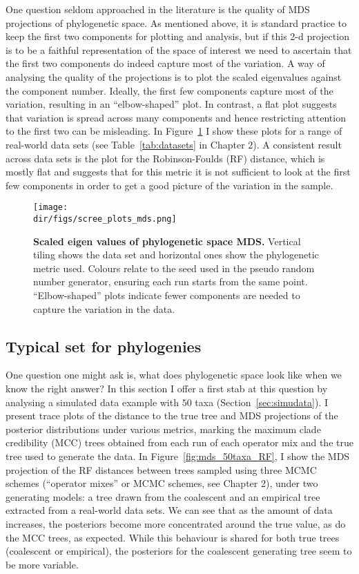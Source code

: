 One question seldom approached in the literature is the quality of MDS projections of phylogenetic space.
As mentioned above, it is standard practice to keep the first two components for plotting and analysis, but if this 2-d  projection is to be a faithful representation of the space of interest we need to ascertain that the first two components do indeed capture most of the variation.
A way of analysing the quality of the projections is to plot the scaled eigenvalues against the component number.
Ideally, the first few components capture most of the variation, resulting in an ``elbow-shaped'' plot.
In contrast, a flat plot suggests that variation is spread across many components and hence restricting attention to the first two can be misleading.
In Figure~\ref{fig:screeplots} I show these plots for a range of real-world data sets (see Table~\ref{tab:datasets} in Chapter 2).
A consistent result across data sets is the plot for the Robinson-Foulds (RF) distance, which is mostly flat and suggests that for this metric it is not sufficient to look at the first few components in order to get a good picture of the variation in the sample.

\begin{figure}[!ht]
\begin{center}
\texttt{[image: \\dir/figs/scree\_plots\_mds.png]} 
\end{center}
 \caption[Scaled eigen values of phylogenetic space MDS.]{\textbf{Scaled eigen values of phylogenetic space MDS.}
 Vertical tiling shows the data set and horizontal ones show the phylogenetic metric used.
 Colours relate to the seed used in the pseudo random number generator, ensuring each run starts from the same point. 
 ``Elbow-shaped'' plots indicate fewer components are needed to capture the variation in the data.
 }
 \label{fig:screeplots}
\end{figure}

\subsection{Typical set for phylogenies}
\label{sec:typical}

One question one might ask is, what does phylogenetic space look like when we know the right answer?
In this section I offer a first stab at this question by analysing a simulated data example with $50$ taxa (Section~\ref{sec:simudata}).
I present trace plots of the distance to the true tree and MDS projections of the posterior distributions under various metrics, marking the maximum clade credibility (MCC) trees obtained from each run of each operator mix and the true tree used to generate the data.
In Figure~\ref{fig:mds_50taxa_RF}, I show the MDS projection of the RF distances between trees sampled using three MCMC schemes (``operator mixes'' or MCMC schemes, see Chapter 2), under two generating models: a tree drawn from the coalescent and an empirical tree extracted from a real-world data sets.
We can see that as the amount of data increases, the posteriors become more concentrated around the true value, as do the MCC trees, as expected.
While this behaviour is shared for both true trees (coalescent or empirical), the posteriors for the coalescent generating tree seem to be more variable.

